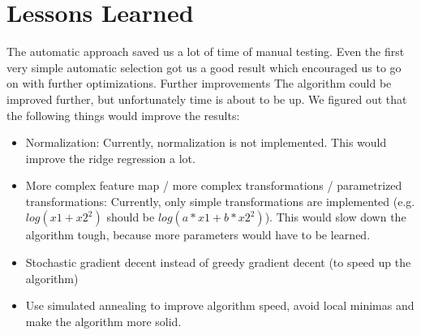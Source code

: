 \documentclass[a4paper, 11pt]{article}
\begin{document}
\section{Lessons Learned}
The automatic approach saved us a lot of time of manual testing. Even the first very simple automatic selection got us a good result which encouraged us to go on with further optimizations.
Further improvements
The algorithm could be improved further, but unfortunately time is about to be up. We figured out that the following things would improve the results:
\begin{itemize}
\item Normalization: Currently, normalization is not implemented. This would improve the ridge regression a lot.
\item More complex feature map / more complex transformations / parametrized transformations: Currently, only simple transformations are implemented (e.g. $log(x1 + x2^2)$ should be $log(a*x1 + b*x2^2)$). This would slow down the algorithm tough, because more parameters would have to be learned.
\item Stochastic gradient decent instead of greedy gradient decent (to speed up the algorithm)
\item Use simulated annealing to improve algorithm speed, avoid local minimas and make the algorithm more solid.
\end{itemize}
\end{document}
